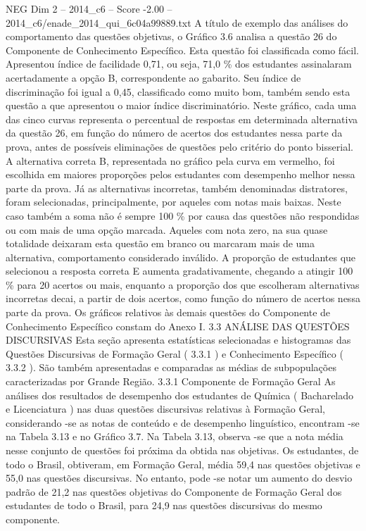 \begin{textsample}{NEG Dim 2 – 2014\_c6 – Score -2.00 – 2014\_c6/enade\_2014\_qui\_6c04a99889.txt}
A título de exemplo das análises do comportamento das questões objetivas, o Gráfico 3.6 analisa a questão 26 do Componente de Conhecimento Específico.
Esta questão foi classificada como fácil.
Apresentou índice de facilidade 0,71, ou seja, 71,0 \% dos estudantes assinalaram acertadamente a opção B, correspondente ao gabarito.
Seu índice de discriminação foi igual a 0,45, classificado como muito bom, também sendo esta questão a que apresentou o maior índice discriminatório.
Neste gráfico, cada uma das cinco curvas representa o percentual de respostas em determinada alternativa da questão 26, em função do número de acertos dos estudantes nessa parte da prova, antes de possíveis eliminações de questões pelo critério do ponto bisserial.
A alternativa correta B, representada no gráfico pela curva em vermelho, foi escolhida em maiores proporções pelos estudantes com desempenho melhor nessa parte da prova.
Já as alternativas incorretas, também denominadas distratores, foram selecionadas, principalmente, por aqueles com notas mais baixas.
Neste caso também a soma não é sempre 100 \% por causa das questões não respondidas ou com mais de uma opção marcada.
Aqueles com nota zero, na sua quase totalidade deixaram esta questão em branco ou marcaram mais de uma alternativa, comportamento considerado inválido.
A proporção de estudantes que selecionou a resposta correta E aumenta gradativamente, chegando a atingir 100 \% para 20 acertos ou mais, enquanto a proporção dos que escolheram alternativas incorretas decai, a partir de dois acertos, como função do número de acertos nessa parte da prova.
Os gráficos relativos às demais questões do Componente de Conhecimento Específico constam do Anexo I. 3.3 ANÁLISE DAS QUESTÕES DISCURSIVAS Esta seção apresenta estatísticas selecionadas e histogramas das Questões Discursivas de Formação Geral ( 3.3.1 ) e Conhecimento Específico ( 3.3.2 ).
São também apresentadas e comparadas as médias de subpopulações caracterizadas por Grande Região. 3.3.1 Componente de Formação Geral As análises dos resultados de desempenho dos estudantes de Química ( Bacharelado e Licenciatura ) nas duas questões discursivas relativas à Formação Geral, considerando -se as notas de conteúdo e de desempenho linguístico, encontram -se na Tabela 3.13 e no Gráfico 3.7.
Na Tabela 3.13, observa -se que a nota média nesse conjunto de questões foi próxima da obtida nas objetivas.
Os estudantes, de todo o Brasil, obtiveram, em Formação Geral, média 59,4 nas questões objetivas e 55,0 nas questões discursivas.
No entanto, pode -se notar um aumento do desvio padrão de 21,2 nas questões objetivas do Componente de Formação Geral dos estudantes de todo o Brasil, para 24,9 nas questões discursivas do mesmo componente.

\end{textsample}
